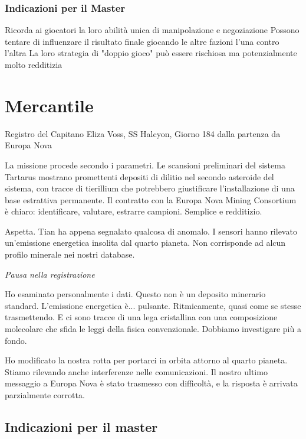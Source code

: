 \documentclass[letterpaper,twocolumn,openany,nodeprecatedcode]{dndbook}
\begin{document}
\subsection{Indicazioni per il Master}
Ricorda ai giocatori la loro abilità unica di manipolazione e negoziazione
Possono tentare di influenzare il risultato finale giocando le altre fazioni l'una contro l'altra
La loro strategia di "doppio gioco" può essere rischiosa ma potenzialmente molto redditizia






\chapter{Mercantile}
\begin{DndReadAloud}    
Registro del Capitano Eliza Voss, SS Halcyon, Giorno 184 dalla partenza da Europa Nova

La missione procede secondo i parametri. Le scansioni preliminari del sistema Tartarus mostrano promettenti depositi di dilitio nel secondo asteroide del sistema, con tracce di tierillium che potrebbero giustificare l'installazione di una base estrattiva permanente. Il contratto con la Europa Nova Mining Consortium è chiaro: identificare, valutare, estrarre campioni. Semplice e redditizio.

Aspetta. Tian ha appena segnalato qualcosa di anomalo. I sensori hanno rilevato un'emissione energetica insolita dal quarto pianeta. Non corrisponde ad alcun profilo minerale nei nostri database.

\textit{Pausa nella registrazione}

Ho esaminato personalmente i dati. Questo non è un deposito minerario standard. L'emissione energetica è... pulsante. Ritmicamente, quasi come se stesse trasmettendo. E ci sono tracce di una lega cristallina con una composizione molecolare che sfida le leggi della fisica convenzionale. Dobbiamo investigare più a fondo.

Ho modificato la nostra rotta per portarci in orbita attorno al quarto pianeta. Stiamo rilevando anche interferenze nelle comunicazioni. Il nostro ultimo messaggio a Europa Nova è stato trasmesso con difficoltà, e la risposta è arrivata parzialmente corrotta.

\end{DndReadAloud}
\section {Indicazioni per il master}
\end{document}
